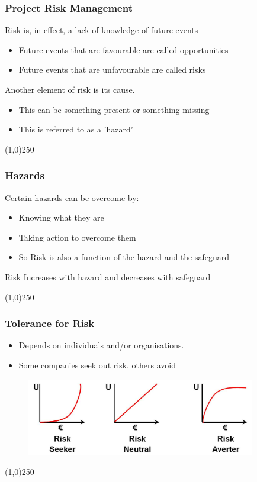 \begin{frame}
\frametitle{Project Risk Management}
Risk is, in effect, a lack of knowledge of future events
\begin{itemize}
	\item Future events that are favourable are called opportunities
	\item Future events that are unfavourable are called risks
\end{itemize}
Another element of risk is its cause.
\begin{itemize}
	\item This can be something present or something missing
	\item This is referred to as a 'hazard'
\end{itemize}
\end{frame}\begin{center}\line(1,0){250}\end{center}







\begin{frame}
\frametitle{Hazards}
Certain hazards can be overcome by:
\begin{itemize}
	\item Knowing what they are
	\item Taking action to overcome them
	\item So Risk is also a function of the hazard and the safeguard
\end{itemize}
Risk Increases with hazard and decreases with safeguard

\end{frame}\begin{center}\line(1,0){250}\end{center}





\begin{frame}
\frametitle{Tolerance for Risk}
	\begin{itemize}
		\item Depends on individuals and/or organisations.
		\item Some companies seek out risk, others avoid
	\end{itemize}
\begin{figure}[h]
	\centering
		\includegraphics[width = 10cm]{images/Utility1.jpg}
	\label{fig:Utility1}
\end{figure}

\end{frame}\begin{center}\line(1,0){250}\end{center}





